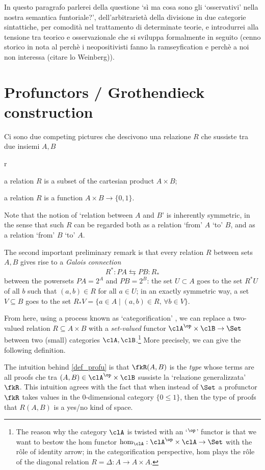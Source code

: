 \documentclass[a4paper]{../birkjour}
\begin{document}
In questo paragrafo parlerei della questione `sì ma cosa sono gli `osservativi' nella nostra semantica funtoriale?', dell'arbitrarietà della divisione in due categorie sintattiche, per comodità nel trattamento di determinate teorie, e introdurrei alla tensione tra teorico e osservazionale che si sviluppa formalmente in seguito (cenno storico in nota al perchè i neopositivisti fanno la ramseyfication e perchè a noi non interessa (citare lo Weinberg)).  

\section{Profunctors / Grothendieck construction}
\label{sec:org7dd09e1}
Ci sono due competing pictures che descivono una relazione $R$ che sussiste tra due insiemi $A,B$
\begin{enumtag}{r}
\item \label{r_1} a relation $R$ is a subset of the cartesian product $A\times B$;
\item \label{r_2} a relation $R$ is a function $A\times B \to \{0,1\}$.
\end{enumtag}
Note that the notion of `relation between $A$ and $B$' is inherently symmetric, in the sense that such $R$ can be regarded both as a relation `from' $A$ `to' $B$, and as a relation `from' $B$ `to' $A$.

The second important preliminary remark is that every relation $R$ between sets $A,B$ gives rise to a \emph{Galois connection} 
\[R^* :PA \leftrightarrows PB : R_* \label{adjunzia} \]
between the powersets $PA=2^A$ and $PB = 2^B$: the set $U\subset A$ goes to the set $R^*U$ of all $b$ such that $(a,b)\in R$ for all $a\in U$; in an exactly symmetric way, a set $V\subseteq B$ goes to the set $R_*V = \{a\in A\mid (a,b) \in R,\, \forall b\in V\}$.

From here, using a process known as `categorification' \cite{baez_catego}, we can replace a two-valued relation $R\subseteq A\times B$ with a \emph{set-valued} functor $\clA^\op\times\clB \to \Set$ between two (small) categories $\clA,\clB$.\footnote{The reason why the category $\clA$ is twisted with an `$^\op$' functor is that we want to bestow the hom functor $\hom_{\clA} : \clA^\op\times\clA \to \Set$ with the r\^ole of identity arrow; in the categorification perspective, hom plays the r\^ole of the diagonal relation $R=\Delta : A\to A\times A$.} More precisely, we can give the following definition.
\begin{definition}[Profunctor]\label{def_profu}
  
\end{definition}
The intuition behind \autoref{def_profu} is that $\fkR(A,B)$ is the \emph{type} whose terms are all proofs che tra $(A,B)\in\clA^\op\times\clB$ sussiste la `relazione generalizzata' $\fkR$. This intuition agrees with the fact that when instead of $\Set$ a profunctor $\fkR$ takes values in the 0-dimensional category $\{0\le 1\}$, then the type of proofs that $R(A,B)$ is a yes/no kind of space.
\end{document}
